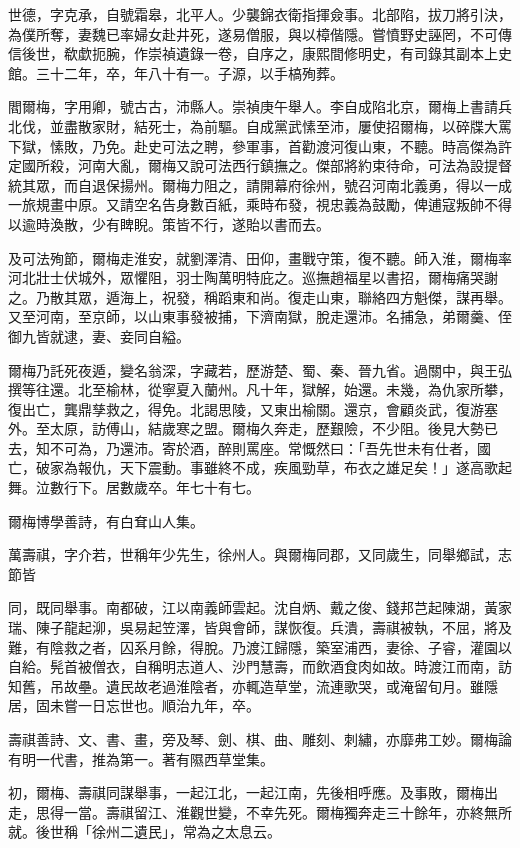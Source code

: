 \begin{pinyinscope}
世德，字克承，自號霜皋，北平人。少襲錦衣衛指揮僉事。北部陷，拔刀將引決，為僕所奪，妻魏已率婦女赴井死，遂易僧服，與以樟偕隱。嘗憤野史誣罔，不可傳信後世，欷歔扼腕，作崇禎遺錄一卷，自序之，康熙間修明史，有司錄其副本上史館。三十二年，卒，年八十有一。子源，以手槁殉葬。

閻爾梅，字用卿，號古古，沛縣人。崇禎庚午舉人。李自成陷北京，爾梅上書請兵北伐，並盡散家財，結死士，為前驅。自成黨武愫至沛，屢使招爾梅，以碎牒大罵下獄，愫敗，乃免。赴史可法之聘，參軍事，首勸渡河復山東，不聽。時高傑為許定國所殺，河南大亂，爾梅又說可法西行鎮撫之。傑部將約束待命，可法為設提督統其眾，而自退保揚州。爾梅力阻之，請開幕府徐州，號召河南北義勇，得以一成一旅規畫中原。又請空名告身數百紙，乘時布發，視忠義為鼓勵，俾逋寇叛帥不得以逾時渙散，少有睥睨。策皆不行，遂貽以書而去。

及可法殉節，爾梅走淮安，就劉澤清、田仰，畫戰守策，復不聽。師入淮，爾梅率河北壯士伏城外，眾懼阻，羽士陶萬明特庇之。巡撫趙福星以書招，爾梅痛哭謝之。乃散其眾，遁海上，祝發，稱蹈東和尚。復走山東，聯絡四方魁傑，謀再舉。又至河南，至京師，以山東事發被捕，下濟南獄，脫走還沛。名捕急，弟爾羹、侄御九皆就逮，妻、妾同自縊。

爾梅乃託死夜遁，變名翁深，字藏若，歷游楚、蜀、秦、晉九省。過關中，與王弘撰等往還。北至榆林，從寧夏入蘭州。凡十年，獄解，始還。未幾，為仇家所攀，復出亡，龔鼎孳救之，得免。北謁思陵，又東出榆關。還京，會顧炎武，復游塞外。至太原，訪傅山，結歲寒之盟。爾梅久奔走，歷艱險，不少阻。後見大勢已去，知不可為，乃還沛。寄於酒，醉則罵座。常慨然曰：「吾先世未有仕者，國亡，破家為報仇，天下震動。事雖終不成，疾風勁草，布衣之雄足矣！」遂高歌起舞。泣數行下。居數歲卒。年七十有七。

爾梅博學善詩，有白耷山人集。

萬壽祺，字介若，世稱年少先生，徐州人。與爾梅同郡，又同歲生，同舉鄉試，志節皆

同，既同舉事。南都破，江以南義師雲起。沈自炳、戴之俊、錢邦芑起陳湖，黃家瑞、陳子龍起泖，吳易起笠澤，皆與會師，謀恢復。兵潰，壽祺被執，不屈，將及難，有陰救之者，囚系月餘，得脫。乃渡江歸隱，築室浦西，妻徐、子睿，灌園以自給。髡首被僧衣，自稱明志道人、沙門慧壽，而飲酒食肉如故。時渡江而南，訪知舊，吊故壘。遺民故老過淮陰者，亦輒造草堂，流連歌哭，或淹留旬月。雖隱居，固未嘗一日忘世也。順治九年，卒。

壽祺善詩、文、書、畫，旁及琴、劍、棋、曲、雕刻、刺繡，亦靡弗工妙。爾梅論有明一代書，推為第一。著有隰西草堂集。

初，爾梅、壽祺同謀舉事，一起江北，一起江南，先後相呼應。及事敗，爾梅出走，思得一當。壽祺留江、淮觀世變，不幸先死。爾梅獨奔走三十餘年，亦終無所就。後世稱「徐州二遺民」，常為之太息云。


\end{pinyinscope}
